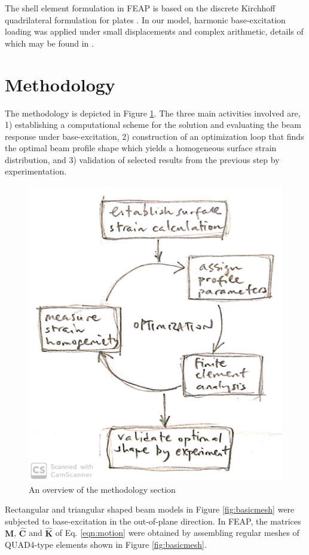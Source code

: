 \documentclass{article}
\begin{document}
The shell element formulation in FEAP is based on the discrete Kirchhoff quadrilateral formulation for plates \cite{batoz82a,taylor88}. In our model, harmonic base-excitation loading was applied under small displacements and complex arithmetic, details of which may be found in \cite{zienkiewicz}. 

\section{Methodology}
\label{sec:fem_opt}
The methodology is depicted in Figure \ref{fig:method}. The three main activities involved are, 1) establishing a computational scheme for the solution and evaluating the beam response under base-excitation, 2) construction of an optimization loop that finds the optimal beam profile shape which yields a homogeneous surface strain distribution, and 3) validation of selected results from the previous step by experimentation.
\begin{figure}
    \centering
\includegraphics[width=.5\linewidth]{figures/metot-el}
    \caption{An overview of the methodology section}
    \label{fig:method}
\end{figure}

 Rectangular and triangular shaped beam models in Figure \ref{fig:basicmesh} were subjected to base-excitation in the out-of-plane direction. In FEAP, the matrices $\mathbf{M}$, $\mathbf{\hat C}$ and $\mathbf{\hat K}$ of Eq. \ref{eqn:motion} were obtained by assembling regular meshes of QUAD4-type elements shown in Figure \ref{fig:basicmesh}. 
 
\end{document}
